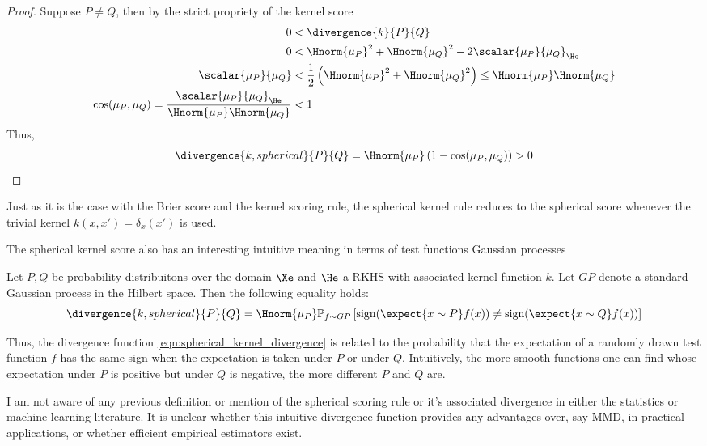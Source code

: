 \begin{theorem} 
\begin{proof}
	Suppose $P\neq Q$, then by the strict propriety of the kernel score
	\begin{align}
		0 &< \divergence{k}{P}{Q}\\
		0 &< \Hnorm{\mu_P}^2 + \Hnorm{\mu_Q}^2 - 2\scalar{\mu_P}{\mu_Q} _{\He}\\
		\scalar{\mu_P}{\mu_Q} &< \frac{1}{2}\left(\Hnorm{\mu_P}^2 + \Hnorm{\mu_Q}^2\right) \leq \Hnorm{\mu_P}\Hnorm{\mu_Q}\\
		\cos(\mu_P,\mu_Q) = \frac{\scalar{\mu_P}{\mu_Q} _{\He}}{\Hnorm{\mu_P}\Hnorm{\mu_Q}} &< 1
	\end{align}
	Thus,
	\begin{align}
		\divergence{k,spherical}{P}{Q} = \Hnorm{\mu_P} \left( 1 - \cos(\mu_P, \mu_Q)\right) > 0
	\end{align}
\end{proof}
\end{theorem}

Just as it is the case with the Brier score and the kernel scoring rule, the spherical kernel rule reduces to the spherical score whenever the trivial kernel $k(x,x') = \delta_{x}(x')$ is used.

The spherical kernel score also has an interesting intuitive meaning in terms of test functions Gaussian processes

\begin{proposition}
Let $P,Q$ be probability distribuitons over the domain $\Xe$ and $\He$ a RKHS with associated kernel function $k$. Let $GP$ denote a standard Gaussian process in the Hilbert space. Then the following equality holds:
\begin{equation}
	 \divergence{k,spherical}{P}{Q} = \Hnorm{\mu_P} \mathbb{P}_{f\sim GP} \left[ \mbox{sign}(\expect{x\sim P} f(x)) \neq \mbox{sign}(\expect{x\sim Q} f(x)) \right]
\end{equation}
\end{proposition}

Thus, the divergence function \eqref{eqn:spherical_kernel_divergence} is related to the probability that the expectation of a randomly drawn test function $f$ has the same sign when the expectation is taken under $P$ or under $Q$. Intuitively, the more smooth functions one can find whose expectation under $P$ is positive but under $Q$ is negative, the more different $P$ and $Q$ are.

I am not aware of any previous definition or mention of the spherical scoring rule or it's associated divergence in either the statistics or machine learning literature. It is unclear whether this intuitive divergence function provides any advantages over, say MMD, in practical applications, or whether efficient empirical estimators exist.

